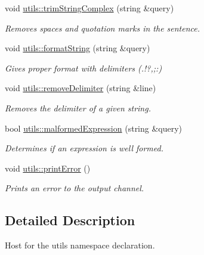 \begin{DoxyCompactItemize}
void \hyperlink{namespaceutils_a0362c7510f0bb0c4449031f897626696}{utils\+::trim\+String\+Complex} (string \&query)
\begin{DoxyCompactList}\small\item\em Removes spaces and quotation marks in the sentence. \end{DoxyCompactList}\item 
void \hyperlink{namespaceutils_a8b0beed284a3321a1f9a08e23bdb3611}{utils\+::format\+String} (string \&query)
\begin{DoxyCompactList}\small\item\em Gives proper format with delimiters (.!?,;\+:) \end{DoxyCompactList}\item 
void \hyperlink{namespaceutils_adf961974462ef6e8d7ccc32311397d75}{utils\+::remove\+Delimiter} (string \&line)
\begin{DoxyCompactList}\small\item\em Removes the delimiter of a given string. \end{DoxyCompactList}\item 
bool \hyperlink{namespaceutils_a6c64225b3c1659211611f32e0776793b}{utils\+::malformed\+Expression} (string \&query)
\begin{DoxyCompactList}\small\item\em Determines if an expression is well formed. \end{DoxyCompactList}\item 
void \hyperlink{namespaceutils_afd76dd21b41c50ce7396e30fb5d8d75b}{utils\+::print\+Error} ()
\begin{DoxyCompactList}\small\item\em Prints an error to the output channel. \end{DoxyCompactList}\end{DoxyCompactItemize}


\subsection{Detailed Description}
Host for the utils namespace declaration. 

